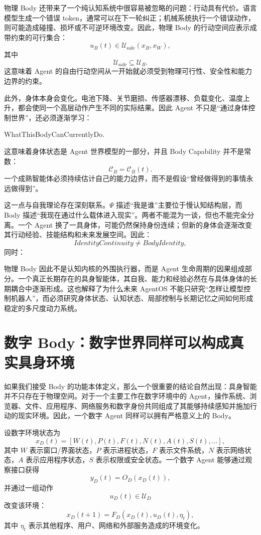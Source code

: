 物理 Body 还带来了一个纯认知系统中很容易被忽略的问题：行动具有代价。语言模型生成一个错误 token，通常可以在下一轮纠正；机械系统执行一个错误动作，则可能造成碰撞、损坏或不可逆环境改变。因此，物理 Body 的行动空间应表示成带约束的可行集合：
\[
u_B(t)
\in
\mathcal U_{\mathrm{safe}}
\left(
x_B,
x_W
\right),
\]
其中
\[
\mathcal U_{\mathrm{safe}}
\subseteq
\mathcal U_B.
\]
这意味着 Agent 的自由行动空间从一开始就必须受到物理可行性、安全性和能力边界的约束。

此外，身体本身会变化。电池下降、关节磨损、传感器漂移、负载变化、温度上升，都会使同一个高层动作产生不同的实际结果。因此 Agent 不只是“通过身体控制世界”，还必须逐渐学习：
\begin{statementbox}
WhatThisBodyCanCurrentlyDo.
\end{statementbox}
这意味着身体状态是 Agent 世界模型的一部分，并且 Body Capability 并不是常数：
\[
\mathcal C_B
=
\mathcal C_B(t).
\]
一个成熟智能体必须持续估计自己的能力边界，而不是假设“曾经做得到的事情永远做得到”。

这一点与自我理论存在深刻联系。$\Psi$ 描述“我是谁”主要位于慢认知结构层，而 Body 描述“我现在通过什么载体进入现实”。两者不能混为一谈，但也不能完全分离。一个 Agent 换了一具身体，可能仍然保持身份连续；但新的身体会逐渐改变其行动经验、技能结构和未来发展空间。因此：
\[
\boxed{
IdentityContinuity
\neq
BodyIdentity,
}
\]
同时：
\begin{statementbox}
\centering
{}
\end{statementbox}

物理 Body 因此不是认知内核的外围执行器，而是 Agent 生命周期的因果组成部分。一个真正长期存在的具身智能体，其自我、能力和经验必然在与具体身体的长期耦合中逐渐形成。这也解释了为什么未来 AgentOS 不能只研究“怎样让模型控制机器人”，而必须研究身体状态、认知状态、局部控制与长期记忆之间如何形成稳定的多尺度动力系统。

\section{数字 Body：数字世界同样可以构成真实具身环境}

如果我们接受 Body 的功能本体定义，那么一个很重要的结论自然出现：具身智能并不只存在于物理空间。对于一个主要工作在数字环境中的 Agent，操作系统、浏览器、文件、应用程序、网络服务和数字身份共同组成了其能够持续感知并施加行动的现实环境。因此，一个数字 Agent 同样可以拥有严格意义上的 Body。

设数字环境状态为
\[
x_D(t)
=
[
W(t),
P(t),
F(t),
N(t),
A(t),
S(t),
\ldots
],
\]
其中 $W$ 表示窗口/界面状态，$P$ 表示进程状态，$F$ 表示文件系统，$N$ 表示网络状态，$A$ 表示应用程序状态，$S$ 表示权限或安全状态。一个数字 Agent 能够通过观察接口获得
\[
y_D(t)
=
O_D(x_D(t)),
\]
并通过一组动作
\[
u_D(t)
\in
\mathcal U_D
\]
改变该环境：
\[
x_D(t+1)
=
F_D
\left(
x_D(t),
u_D(t),
\eta_t
\right),
\]
其中 $\eta_t$ 表示其他程序、用户、网络和外部服务造成的环境变化。

